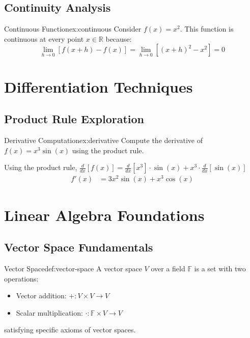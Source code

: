 \documentclass[12pt,a4paper]{article}
\begin{document}
\subsection{Continuity Analysis}
\begin{Example}{Continuous Function}{ex:continuous}
    Consider $f(x) = x^2$. This function is continuous at every point $x \in \mathbb{R}$ because:
    \[\lim_{h \to 0} [f(x+h) - f(x)] = \lim_{h \to 0} [(x+h)^2 - x^2] = 0\]
\end{Example}

\section{Differentiation Techniques}

\subsection{Product Rule Exploration}
\begin{Exercise}{Derivative Computation}{ex:derivative}
    Compute the derivative of $f(x) = x^3 \sin(x)$ using the product rule.
\end{Exercise}

\begin{solution}
    Using the product rule, $\frac{d}{dx}[f(x)] = \frac{d}{dx}[x^3] \cdot \sin(x) + x^3 \cdot \frac{d}{dx}[\sin(x)]$
    \begin{align*}
        f'(x) &= 3x^2 \sin(x) + x^3 \cos(x)
    \end{align*}
\end{solution}

\section{Linear Algebra Foundations}

\subsection{Vector Space Fundamentals}
\begin{Definition}{Vector Space}{def:vector-space}
    A vector space $V$ over a field $\mathbb{F}$ is a set with two operations:
    \begin{itemize}
        \item Vector addition: $+: V \times V \to V$
        \item Scalar multiplication: $\cdot: \mathbb{F} \times V \to V$
    \end{itemize}
    satisfying specific axioms of vector spaces.
\end{Definition}
\end{document}
